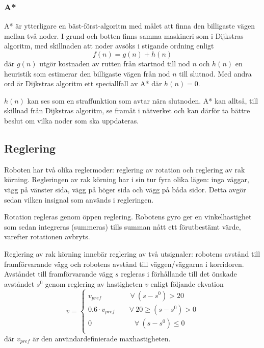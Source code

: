 \documentclass[11pt]{article}
\begin{document}
\begin{flushleft}
\subsubsection{A*}
A* är ytterligare en bäst-först-algoritm med målet att finna den billigaste vägen mellan två noder. I grund och botten finns samma maskineri som i Dijkstras algoritm, med skillnaden att noder avsöks i stigande ordning enligt
\begin{equation*}
	f(n) = g(n) + h(n)
\end{equation*}
där $g(n)$ utgör kostnaden av rutten från startnod till nod $n$ och $h(n)$ en heuristik som estimerar den billigaste vägen från nod $n$ till slutnod. Med andra ord är Dijkstras algoritm ett speciallfall av A* där $h(n) = 0$.

$h(n)$ kan ses som en straffunktion som avtar nära slutnoden. A* kan alltså, till skillnad från Dijkstras algoritm, se framåt i nätverket och kan därför ta bättre beslut om vilka noder som ska uppdateras.

\subsection{Reglering}\label{subsection:reglering}
Roboten har två olika reglermoder: reglering av rotation och reglering av rak körning. Regleringen av rak körning har i sin tur fyra olika lägen: inga väggar, vägg på vänster sida, vägg på höger sida och vägg på båda sidor. Detta avgör sedan vilken insignal som används i regleringen.

Rotation regleras genom öppen reglering. Robotens gyro ger en vinkelhastighet som sedan integreras (summeras) tills summan nått ett förutbestämt värde, varefter rotationen avbryts.

Reglering av rak körning innebär reglering av två utsignaler: robotens avstånd till framförvarande vägg och robotens avstånd till väggen/väggarna i korridoren. Avståndet till framförvarande vägg $s$ regleras i förhållande till det önskade avståndet $s^0$ genom reglering av hastigheten $v$ enligt följande ekvation
\begin{equation*}
	v = 
	\begin{cases}
		v_{pref} \qquad\qquad \forall \ (s - s^0) > 20 \\
		0.6 \cdot v_{pref} \qquad \forall \ 20 \geq (s - s^0) > 0 \\
		0 \qquad\qquad\qquad \forall \ (s - s^0)\leq 0 \\
	\end{cases}
\end{equation*}
där $v_{pref}$ är den användardefinierade maxhastigheten.


\end{flushleft}
\end{document}
